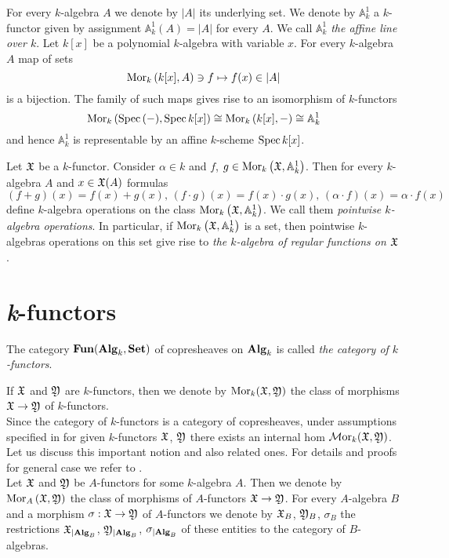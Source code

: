 \begin{example}
For every $k$-algebra $A$ we denote by $|A|$ its underlying set. We denote by $\mathbb{A}^1_k$ a $k$-functor given by assignment $\mathbb{A}^1_k(A)=|A|$ for every $A$. We call $\mathbb{A}^1_k$ \textit{the affine line over $k$}. Let $k[x]$ be a polynomial $k$-algebra with variable $x$. For every $k$-algebra $A$ map of sets 
$$\mathrm{Mor}_{k}\left(k[x],A\right)\ni f \mapsto f(x)\in |A|$$
is a bijection. The family of such maps gives rise to an isomorphism of $k$-functors 
$$\mathrm{Mor}_k\left(\mathrm{Spec}\,(-),\mathrm{Spec}\, k[x]\right)\cong \mathrm{Mor}_k\left(k[x],-\right)\cong \mathbb{A}^1_k$$
and hence $\mathbb{A}^1_k$ is representable by an affine $k$-scheme $\mathrm{Spec}\, k[x]$.
\end{example}

\begin{definition}
Let ${\mathfrak X}$ be a $k$-functor. Consider $\alpha \in k$ and $f$, $g\in \mathrm{Mor}_k\left({\mathfrak X}, \mathbb{A}^1_k\right)$. Then for every $k$-algebra $A$ and $x\in {\mathfrak X}(A)$ formulas
$$\left(f+g\right)(x) = f(x)+g(x),\,\left(f\cdot g\right)(x) = f(x)\cdot g(x),\,\left(\alpha \cdot f\right)(x) = \alpha \cdot f(x)$$
define $k$-algebra operations on the class $\mathrm{Mor}_k\left({\mathfrak X},\mathbb{A}^1_k\right)$. We call them \textit{pointwise $k$-algebra operations}. In particular, if $\mathrm{Mor}_k\left({\mathfrak X},\mathbb{A}^1_k\right)$ is a set, then pointwise $k$-algebras operations on this set give rise to \textit{the $k$-algebra of regular functions on ${\mathfrak X}$}.
\end{definition}

\section{\textit{k}-functors}

\begin{definition}
The category $\mathbf{Fun}(\mathbf{Alg}_k,\mathbf{Set})$ of copresheaves on $\mathbf{Alg}_k$ is called \textit{the category of $k$-functors}.
\end{definition}
\noindent
If ${\mathfrak X}$ and ${\mathfrak Y}$ are $k$-functors, then we denote by $\mathrm{Mor}_k({\mathfrak X},{\mathfrak Y})$ the class of morphisms ${\mathfrak X}\rightarrow {\mathfrak Y}$ of $k$-functors.\\
Since the category of $k$-functors is a category of copresheaves, under assumptions specified in {\cite[section 5]{Presheaves}} for given $k$-functors ${\mathfrak X}$, ${\mathfrak Y}$ there exists an internal hom $\mathcal{M}\mathrm{or}_k({\mathfrak X},{\mathfrak Y})$. Let us discuss this important notion and also related ones. For details and proofs for general case we refer to {\cite[section 5]{Presheaves}}.\\
Let ${\mathfrak X}$ and ${\mathfrak Y}$ be $A$-functors for some $k$-algebra $A$. Then we denote by $\mathrm{Mor}_A\left({\mathfrak X},{\mathfrak Y}\right)$ the class of morphisms of $A$-functors ${\mathfrak X}\rightarrow {\mathfrak Y}$. For every $A$-algebra $B$ and a morphism $\sigma:{\mathfrak X}\rightarrow {\mathfrak Y}$ of $A$-functors we denote by ${\mathfrak X}_{B}$, ${\mathfrak Y}_{B}$, $\sigma_{B}$ the restrictions ${\mathfrak X}_{\mid \mathbf{Alg}_B}$, ${\mathfrak Y}_{\mid \mathbf{Alg}_B}$, $\sigma_{\mid \mathbf{Alg}_B}$ of these entities to the category of $B$-algebras. 

